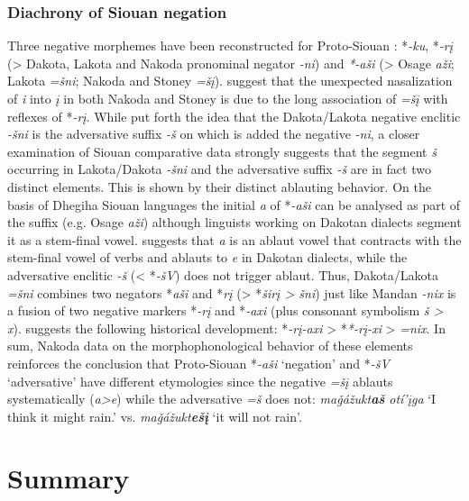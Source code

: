 \documentclass[output=paper,colorlinks,citecolor=brown]{langscibook}
\begin{document}
\subsubsection{Diachrony of Siouan negation}\label{sec:nak:4.5.3}
Three negative morphemes have been reconstructed for Proto-Siouan \citep{RankinEtAl2015}: *\textit{-ku}, *\textit{-rį} (> Dakota, Lakota and Nakoda pronominal negator \textit{-ni}) and \mbox{\textit{*-aši}}
(> Osage \textit{aži}; Lakota \textit{=šni}; Nakoda and Stoney \textit{=šį}). \citet{RankinEtAl2015} suggest that the unexpected nasalization of \textit{i} into \textit{į} in both Nakoda and Stoney is due to the long association of \textit{=šį} with reflexes of *\textit{-rį}. While \citet[109]{BoasDeloria1941} put forth the idea that the Dakota/Lakota negative enclitic \textit{-šni} is the adversative suffix \textit{-š} on which is added the negative \textit{-ni}, a closer examination of Siouan comparative data strongly suggests that the segment \textit{š} occurring in Lakota/Dakota \textit{-šni} and the adversative suffix \textit{-š} are in fact two distinct elements. This is shown by their distinct ablauting behavior. On the basis of Dhegiha Siouan languages the initial \textit{a} of *\textit{-aši} can be analysed as part of the suffix (e.g. Osage \textit{aži}) although linguists working on Dakotan dialects segment it as a stem-final vowel. \citet[6]{Rankin2006} suggests that \textit{a} is an ablaut vowel that contracts with the stem-final vowel of verbs and ablauts to \textit{e} in Dakotan dialects, while the adversative enclitic \textit{-š} (< *\textit{-šV}) does not trigger ablaut. Thus, Dakota/Lakota \textit{=šni} combines two negators *\textit{aši} and *\textit{rį} (> *\textit{širį > šni}) just like Mandan \textit{-nix} is a fusion of two negative markers *\textit{-rį} and *\textit{-axi} (plus consonant symbolism \textit{š > x}). \citet[303]{Kasak2019} suggests the following historical development: *\textit{-rį-axi} > *\textit{*-rį-xi} > \textit{=nix}.
In sum, Nakoda data on the morphophonological behavior of these elements reinforces the conclusion that Proto-Siouan *\textit{-aši} ‘negation’ and *\textit{-šV} ‘adversative’ have different etymologies since the negative \textit{=šį} ablauts systematically (\textit{a>e}) while
the adversative \textit{=š} does not: \textit{maǧážukt\textbf{aš} otí’įga} ‘I think it might rain.’ \citep[239]{Cumberland2005} vs. \textit{maǧážukt\textbf{ešį}} ‘it will not rain’.

\section{Summary}\label{sec:nak:5}
\end{document}
